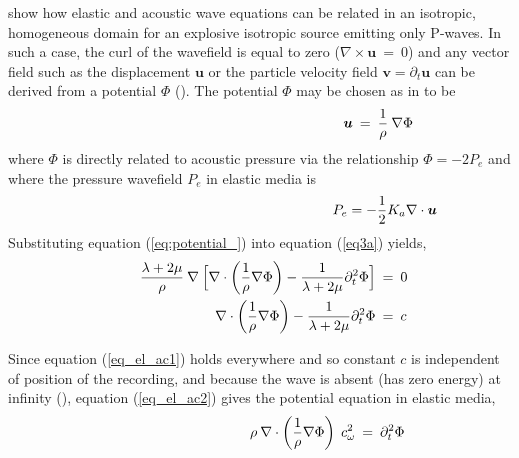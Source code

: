 \documentclass[]{article}
\begin{document}
	\textcite{cance2015validity} show how elastic and acoustic wave equations can be related in an isotropic, homogeneous domain for an explosive isotropic source emitting only P-waves. In such a case, the curl of the wavefield is equal to zero ($\nabla \times \bm{u} \: = \: 0$) and any vector field such as the displacement $\bm{u}$ or the particle velocity field $\bm{v}= \partial_{t} \bm{u}$  can be derived from a potential $\Phi$ (\cite{kaufman2000acoustic}). The potential $\Phi$ may be chosen as in \textcite{cance2015validity} to be
	\begin{align}\label{eq:potential_}
		\shoveright \shoveright \shoveright \shoveright \shoveright \shoveright  \shoveright \shoveright  \shoveright  \shoveright  \shoveright \shoveright  \shoveright  \shoveright \shoveright \shoveright  \shoveright  \shoveright
		\bm{u} \: &=\: \frac{1}{\rho} \: \nabla \Phi
	\end{align}
	where $\Phi$ is directly related to acoustic pressure via the relationship $\Phi = -2 P_{e}$ and where the pressure wavefield $P_{e}$ in elastic media is %
	\begin{align}\label{eq:press_el}
		\shoveright \shoveright \shoveright \shoveright \shoveright \shoveright  \shoveright \shoveright  \shoveright  \shoveright  \shoveright \shoveright  \shoveright  \shoveright \shoveright \shoveright  \shoveright  \shoveright
		P_{e} = -\frac{1}{2} K_{a} \nabla \cdot \bm{u}
	\end{align}
	Substituting equation (\ref{eq:potential_}) into equation (\ref{eq3a}) yields,
	\begin{align}
		\shoveright  \shoveright  
		\frac{\lambda + 2 \mu}{\rho} \: \nabla \: \Big[  \nabla \cdot \bigg( \frac{1}{\rho} \nabla \Phi \bigg) - \frac{1}{\lambda + 2 \mu} \partial_{t}^{2} \Phi \Big] \: &= \: 0 \label{eq_el_ac1} \\ 
		\nabla \cdot \bigg( \frac{1}{\rho} \nabla \Phi \bigg) - \frac{1}{\lambda + 2 \mu} \partial_{t}^{2} \Phi \: & = \: c \label{eq_el_ac2}
	\end{align} 

	Since equation (\ref{eq_el_ac1}) holds everywhere and so constant $c$ is independent of position of the recording, and because the wave is absent (has zero energy) at infinity (\cite{kaufman2000acoustic}), equation (\ref{eq_el_ac2}) gives the potential equation in elastic media, 
	\begin{align} 
		\shoveright \shoveright \shoveright \shoveright \shoveright \shoveright	\shoveright \shoveright \shoveright	\shoveright
		\: \: \: \rho \: \nabla \cdot \bigg(\frac{1}{\rho} \nabla \Phi \bigg) \: \: c_{\omega}^{2} \:  &= \:  \partial_{t}^{2} \Phi  \label{eq_el_potential}
	\end{align}
	
\end{document}
